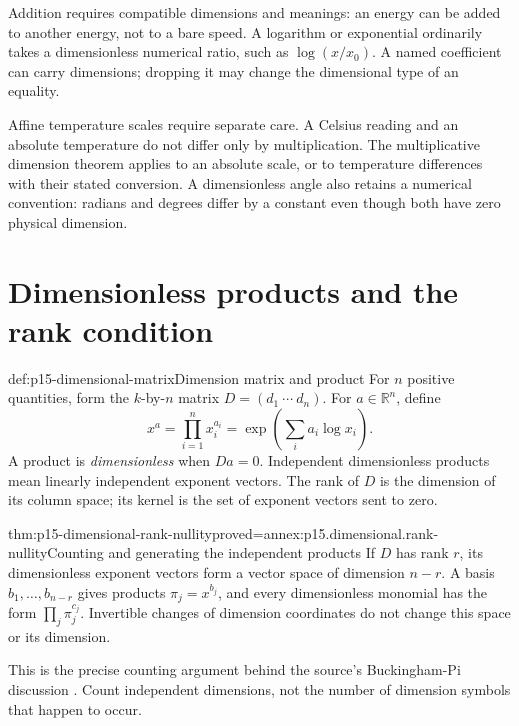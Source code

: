 Addition requires compatible dimensions and meanings: an energy can be added
to another energy, not to a bare speed. A logarithm or exponential ordinarily
takes a dimensionless numerical ratio, such as \(\log(x/x_0)\).
A named coefficient can carry dimensions; dropping it may change the
dimensional type of an equality.

Affine temperature scales require separate care. A Celsius reading and an
absolute temperature do not differ only by multiplication. The multiplicative
dimension theorem applies to an absolute scale, or to temperature differences
with their stated conversion. A dimensionless angle also retains a numerical
convention: radians and degrees differ by a constant even though both have
zero physical dimension.

\section{Dimensionless products and the rank condition}
\label{sec:p15-dimensional-groups}

\begin{hbdefinition}{def:p15-dimensional-matrix}{Dimension matrix and product}
For \(n\) positive quantities, form the \(k\)-by-\(n\) matrix
\(D=(d_1\ \cdots\ d_n)\). For \(a\in\mathbb R^n\), define
\[
 x^a=\prod_{i=1}^n x_i^{a_i}
       =\exp\!\left(\sum_i a_i\log x_i\right).
\]
A product is \emph{dimensionless} when \(Da=0\).
Independent dimensionless products mean linearly independent exponent vectors.
The rank of \(D\) is the dimension of its column space; its kernel is
the set of exponent vectors sent to zero.
\end{hbdefinition}

\begin{hbtheorem}{thm:p15-dimensional-rank-nullity}{proved=annex:p15.dimensional.rank-nullity}{Counting and generating the independent products}
If \(D\) has rank \(r\), its dimensionless exponent vectors form a vector
space of dimension \(n-r\). A basis \(b_1,\ldots,b_{n-r}\) gives products
\(\pi_j=x^{b_j}\), and every dimensionless monomial has the form
\(\prod_j\pi_j^{c_j}\). Invertible changes of dimension coordinates do not
change this space or its dimension.
\end{hbtheorem}

This is the precise counting argument behind the source's Buckingham-Pi
discussion \cite[5.1.2]{Mahajan2014Insight}. Count independent dimensions,
not the number of dimension symbols that happen to occur.

